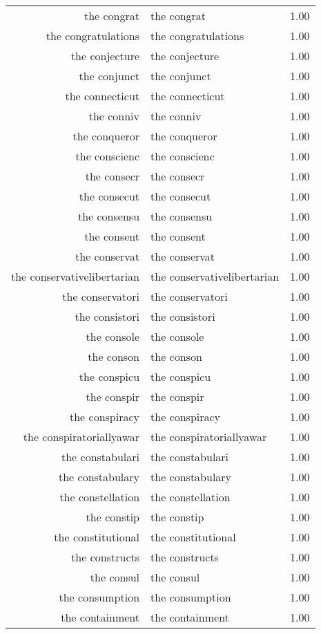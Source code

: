 \begin{table}[ht]
\begin{tabular}{rlr}
  the congrat & the congrat & 1.00 \\ 
  the congratulations & the congratulations & 1.00 \\ 
  the conjecture & the conjecture & 1.00 \\ 
  the conjunct & the conjunct & 1.00 \\ 
  the connecticut & the connecticut & 1.00 \\ 
  the conniv & the conniv & 1.00 \\ 
  the conqueror & the conqueror & 1.00 \\ 
  the conscienc & the conscienc & 1.00 \\ 
  the consecr & the consecr & 1.00 \\ 
  the consecut & the consecut & 1.00 \\ 
  the consensu & the consensu & 1.00 \\ 
  the consent & the consent & 1.00 \\ 
  the conservat & the conservat & 1.00 \\ 
  the conservativelibertarian & the conservativelibertarian & 1.00 \\ 
  the conservatori & the conservatori & 1.00 \\ 
  the consistori & the consistori & 1.00 \\ 
  the console & the console & 1.00 \\ 
  the conson & the conson & 1.00 \\ 
  the conspicu & the conspicu & 1.00 \\ 
  the conspir & the conspir & 1.00 \\ 
  the conspiracy & the conspiracy & 1.00 \\ 
  the conspiratoriallyawar & the conspiratoriallyawar & 1.00 \\ 
  the constabulari & the constabulari & 1.00 \\ 
  the constabulary & the constabulary & 1.00 \\ 
  the constellation & the constellation & 1.00 \\ 
  the constip & the constip & 1.00 \\ 
  the constitutional & the constitutional & 1.00 \\ 
  the constructs & the constructs & 1.00 \\ 
  the consul & the consul & 1.00 \\ 
  the consumption & the consumption & 1.00 \\ 
  the containment & the containment & 1.00 \\ 

\end{tabular}
\end{table}

